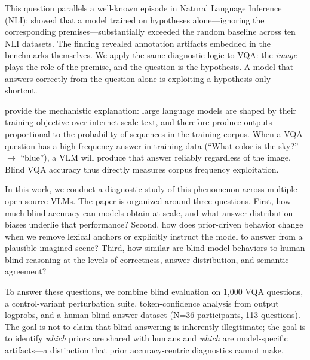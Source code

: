 \documentclass[letterpaper]{article}
\begin{document}
This question parallels a well-known episode in Natural Language Inference
(NLI): \citet{poliak2018hypothesis} showed that a model trained on hypotheses
alone---ignoring the corresponding premises---substantially exceeded the random
baseline across ten NLI datasets. The finding revealed annotation artifacts
embedded in the benchmarks themselves. We apply the same diagnostic logic to
VQA: the \emph{image} plays the role of the premise, and the question is the
hypothesis. A model that answers correctly from the question alone is exploiting
a hypothesis-only shortcut.

\citet{mccoy2024embers} provide the mechanistic explanation: large language
models are shaped by their training objective over internet-scale text, and
therefore produce outputs proportional to the probability of sequences in the
training corpus. When a VQA question has a high-frequency answer in training
data (``What color is the sky?'' $\to$ ``blue''), a VLM will produce that answer
reliably regardless of the image. Blind VQA accuracy thus directly measures
corpus frequency exploitation.

In this work, we conduct a diagnostic study of this phenomenon across multiple
open-source VLMs. The paper is organized around three questions.
First, how much blind accuracy can models obtain at scale, and what answer
distribution biases underlie that performance?
Second, how does prior-driven behavior change when we remove lexical anchors or
explicitly instruct the model to answer from a plausible imagined scene?
Third, how similar are blind model behaviors to human blind reasoning at the
levels of correctness, answer distribution, and semantic agreement?

To answer these questions, we combine blind evaluation on 1,000 VQA questions,
a control-variant perturbation suite, token-confidence analysis from output
logprobs, and a
human blind-answer dataset (N=36 participants, 113 questions). The goal is not
to claim that blind answering is inherently illegitimate; the goal is to
identify \emph{which} priors are shared with humans and \emph{which} are
model-specific artifacts---a distinction that prior accuracy-centric diagnostics
cannot make.
\end{document}
